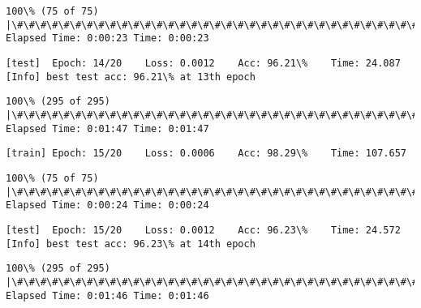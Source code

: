 \documentclass[11pt]{article}
\begin{document}
    \begin{Verbatim}[commandchars=\\\{\}]
100\% (75 of 75) |\#\#\#\#\#\#\#\#\#\#\#\#\#\#\#\#\#\#\#\#\#\#\#\#\#\#\#\#\#\#\#\#\#\#\#\#\#\#\#\#\#\#\#\#\#\#\#\#\#\#\#\#\#\#\#\#\#\#\#\#\#\#\#\#\#| Elapsed Time: 0:00:23 Time: 0:00:23

    \end{Verbatim}

    \begin{Verbatim}[commandchars=\\\{\}]
[test]	Epoch: 14/20	Loss: 0.0012	Acc: 96.21\%	Time: 24.087
[Info] best test acc: 96.21\% at 13th epoch

    \end{Verbatim}

    \begin{Verbatim}[commandchars=\\\{\}]
100\% (295 of 295) |\#\#\#\#\#\#\#\#\#\#\#\#\#\#\#\#\#\#\#\#\#\#\#\#\#\#\#\#\#\#\#\#\#\#\#\#\#\#\#\#\#\#\#\#\#\#\#\#\#\#\#\#\#\#\#\#\#\#\#\#\#\#\#| Elapsed Time: 0:01:47 Time: 0:01:47

    \end{Verbatim}

    \begin{Verbatim}[commandchars=\\\{\}]
[train]	Epoch: 15/20	Loss: 0.0006	Acc: 98.29\%	Time: 107.657

    \end{Verbatim}

    \begin{Verbatim}[commandchars=\\\{\}]
100\% (75 of 75) |\#\#\#\#\#\#\#\#\#\#\#\#\#\#\#\#\#\#\#\#\#\#\#\#\#\#\#\#\#\#\#\#\#\#\#\#\#\#\#\#\#\#\#\#\#\#\#\#\#\#\#\#\#\#\#\#\#\#\#\#\#\#\#\#\#| Elapsed Time: 0:00:24 Time: 0:00:24

    \end{Verbatim}

    \begin{Verbatim}[commandchars=\\\{\}]
[test]	Epoch: 15/20	Loss: 0.0012	Acc: 96.23\%	Time: 24.572
[Info] best test acc: 96.23\% at 14th epoch

    \end{Verbatim}

    \begin{Verbatim}[commandchars=\\\{\}]
100\% (295 of 295) |\#\#\#\#\#\#\#\#\#\#\#\#\#\#\#\#\#\#\#\#\#\#\#\#\#\#\#\#\#\#\#\#\#\#\#\#\#\#\#\#\#\#\#\#\#\#\#\#\#\#\#\#\#\#\#\#\#\#\#\#\#\#\#| Elapsed Time: 0:01:46 Time: 0:01:46

    \end{Verbatim}
\end{document}
